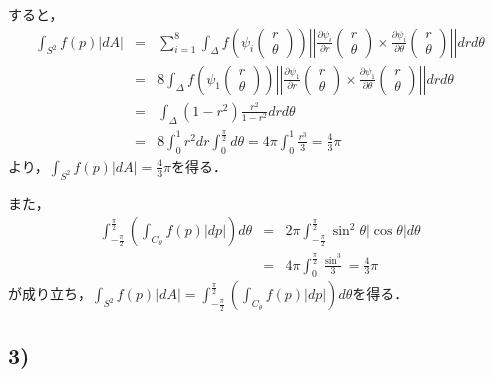 \documentclass[dvipdfmx,nosetpagesize, uplatex]{jsarticle}
\theoremstyle{definition}
\theoremstyle{StatementsWithStar}
\theoremstyle{StatementsWithStar2}
\theoremstyle{StatementsWithStar3}
\theoremstyle{StatementsWithCCirc}
\theoremstyle{definition}
\begin{document}
すると，
\begin{eqnarray*}
    \int_{S^2}f(p)|dA| &=& \sum^8_{i=1}\int_{\Delta}f\left(\psi_i\left(\begin{array}{c}r \\\theta \end{array}\right)\right)\left|\left| \frac{\partial \psi_i}{\partial r}\left(\begin{array}{c}r \\\theta \end{array}\right)\times \frac{\partial \psi_i}{\partial \theta}\left(\begin{array}{c}r \\\theta \end{array}\right) \right|\right|drd\theta \\
    &=& 8\int_{\Delta}f\left(\psi_1\left(\begin{array}{c}r \\\theta \end{array}\right)\right)\left|\left| \frac{\partial \psi_1}{\partial r}\left(\begin{array}{c}r \\\theta \end{array}\right)\times \frac{\partial \psi_1}{\partial \theta}\left(\begin{array}{c}r \\\theta \end{array}\right) \right|\right|drd\theta \\
    &=& \int_\Delta (1-r^2)\frac{r^2}{1-r^2}drd\theta \\
    &=& 8\int^1_0r^2dr\int^{\frac{\pi}{2}}_0d\theta = 4\pi\int^1_0\frac{r^3}{3} = \frac{4}{3}\pi
\end{eqnarray*}
より，$\int_{S^2}f(p)|dA|=\frac{4}{3}\pi$を得る．

また，
\begin{eqnarray*}
    \int^{\frac{\pi}{2}}_{-\frac{\pi}{2}}\left( \int_{C_\theta}f(p)|dp| \right)d\theta
    &=& 2\pi\int^{\frac{\pi}{2}}_{-\frac{\pi}{2}} \sin^2\theta |\cos\theta|d\theta \\
    &=& 4\pi \int^{\frac{\pi}{2}}_0 \frac{\sin^3}{3} = \frac{4}{3}\pi
\end{eqnarray*}
が成り立ち，$\int_{S^2}f(p)|dA|=\int^{\frac{\pi}{2}}_{-\frac{\pi}{2}}\left( \int_{C_\theta}f(p)|dp| \right)d\theta$を得る．

\subsection*{3)}
\end{document}
